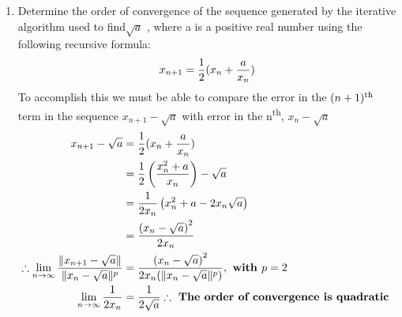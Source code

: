 \documentclass[a4paper,12pt]{article}
\begin{document}
\begin{enumerate}[label=(\alph*)]
\item Determine the order of convergence of the sequence generated by the iterative algorithm used to find$\sqrt{a}$ , where a is a positive real number using the following recursive formula: \[x_{n+1} = {1 \over 2} (x_n + {a \over x_n}) \] To accomplish this we must be able to compare the error in the $(n+1)\textsuperscript{th}$ term in the sequence $x_{n+1} - \sqrt{a}$ with error in the n\textsuperscript{th}, $x_{n} - \sqrt{a}$
\newpage
\color{blue}{\Large Solution:}
\begin{align*}
x_{n+1} - \sqrt{a} &= {1 \over 2} (x_n + {a \over x_n})\\ &= {1 \over 2}\left(\dfrac{x_n^2+a}{x_n}\right) - \sqrt{a} \\ &= {1 \over 2x_n}\left(x_n^2 +a -2x_n \sqrt{a} \right) \\ &=\dfrac{\left( x_n -\sqrt{a} \right)^2}{2x_n}\\ \therefore \lim_{n \to \infty} \dfrac{\|x_{n+1} - \sqrt{a}\|}{\|x_{n} - \sqrt{a}\|^p} &= \dfrac{\left( x_n -\sqrt{a} \right)^2}{2x_n(\|x_{n} - \sqrt{a}\|^p)} , \textbf{ with } p =2 \\  \lim_{n \to \infty} \dfrac{1}{2x_n} &= \dfrac{1}{2\sqrt{a}} \therefore \textbf{ The order of convergence is quadratic }
\end{align*}
\end{enumerate}
\end{document}
